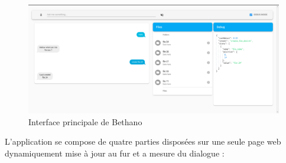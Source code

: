 \begin{figure}[H]
	\centering
	\includegraphics[width=.8\linewidth]{images/Realisation/app_wiss.png} 
	\caption{Interface principale de Bethano}
\end{figure} 

\par 
L'application se compose de quatre parties disposées sur une seule page web dynamiquement mise à jour au fur et a mesure du dialogue :

